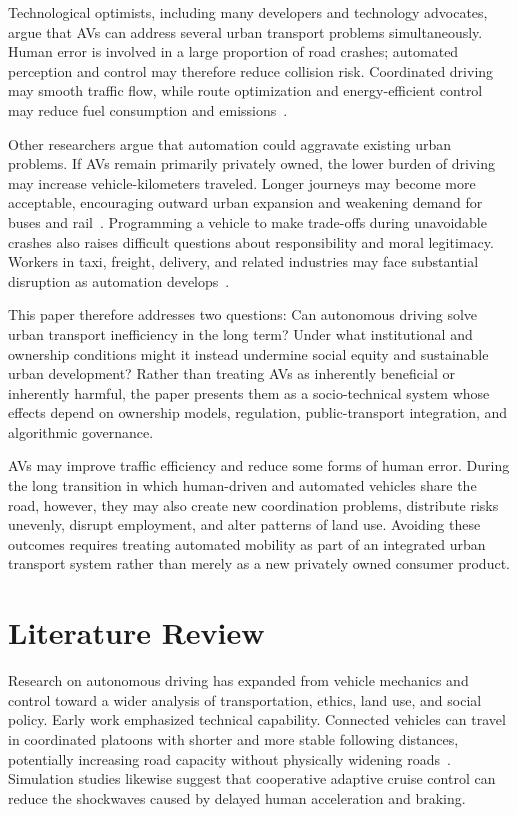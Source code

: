 \documentclass[12pt,a4paper]{article}
\begin{document}
Technological optimists, including many developers and technology advocates, argue that AVs can address several urban transport problems simultaneously. Human error is involved in a large proportion of road crashes; automated perception and control may therefore reduce collision risk. Coordinated driving may smooth traffic flow, while route optimization and energy-efficient control may reduce fuel consumption and emissions~\citep{fagnant2015}.

Other researchers argue that automation could aggravate existing urban problems. If AVs remain primarily privately owned, the lower burden of driving may increase vehicle-kilometers traveled. Longer journeys may become more acceptable, encouraging outward urban expansion and weakening demand for buses and rail~\citep{milakis2017,litman2020}. Programming a vehicle to make trade-offs during unavoidable crashes also raises difficult questions about responsibility and moral legitimacy. Workers in taxi, freight, delivery, and related industries may face substantial disruption as automation develops~\citep{frey2017}.

This paper therefore addresses two questions: Can autonomous driving solve urban transport inefficiency in the long term? Under what institutional and ownership conditions might it instead undermine social equity and sustainable urban development? Rather than treating AVs as inherently beneficial or inherently harmful, the paper presents them as a socio-technical system whose effects depend on ownership models, regulation, public-transport integration, and algorithmic governance.

AVs may improve traffic efficiency and reduce some forms of human error. During the long transition in which human-driven and automated vehicles share the road, however, they may also create new coordination problems, distribute risks unevenly, disrupt employment, and alter patterns of land use. Avoiding these outcomes requires treating automated mobility as part of an integrated urban transport system rather than merely as a new privately owned consumer product.

\section{Literature Review}

Research on autonomous driving has expanded from vehicle mechanics and control toward a wider analysis of transportation, ethics, land use, and social policy. Early work emphasized technical capability. Connected vehicles can travel in coordinated platoons with shorter and more stable following distances, potentially increasing road capacity without physically widening roads~\citep{anderson2016}. Simulation studies likewise suggest that cooperative adaptive cruise control can reduce the shockwaves caused by delayed human acceleration and braking.
\end{document}
